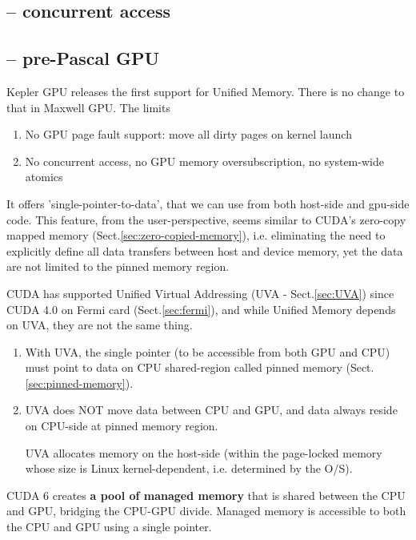 \subsection{-- concurrent access}


\subsection{-- pre-Pascal GPU}

Kepler GPU releases the first support for Unified Memory. There is no change to
that in Maxwell GPU. The limits

\begin{enumerate}
  \item  No GPU page fault support: move all dirty pages on kernel launch
  
  \item No concurrent access, no GPU memory oversubscription, no system-wide atomics
\end{enumerate}



It offers 'single-pointer-to-data', that we can use from both host-side and
gpu-side code. This feature, from the user-perspective, seems similar to CUDA’s
zero-copy mapped memory (Sect.\ref{sec:zero-copied-memory}), i.e. eliminating
the need to explicitly define all data transfers between host and device memory,
yet the data are not limited to the pinned memory region.


CUDA has supported Unified Virtual Addressing (UVA - Sect.\ref{sec:UVA}) since
CUDA 4.0 on Fermi card (Sect.\ref{sec:fermi}), and while Unified Memory depends
on UVA, they are not the same thing. 
\begin{enumerate}
  
  \item With UVA, the single pointer (to be accessible from both GPU and CPU)
  must point to data on CPU shared-region called pinned memory
  (Sect.\ref{sec:pinned-memory}).
  
  \item UVA does NOT move data between CPU and GPU, and data always reside on
  CPU-side at pinned memory region. 
  
  UVA allocates memory on the host-side (within the page-locked memory whose
  size is Linux kernel-dependent, i.e. determined by the O/S).
\end{enumerate}

CUDA 6 creates {\bf a pool of managed memory} that is shared between the CPU and GPU,
bridging the CPU-GPU divide. Managed memory is accessible to both the CPU and
GPU using a single pointer.



